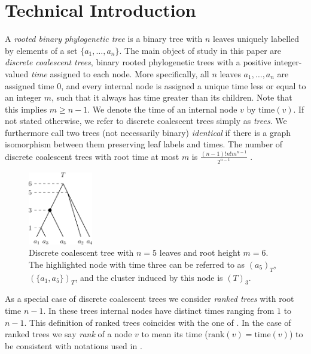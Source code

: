 \documentclass[11pt]{amsart}
\newcommand{\rank}{\mathrm{rank}}
\newcommand{\ntime}{\mathrm{time}}
\newcommand{\summary}[1]{} %
\begin{document}
\section{Technical Introduction}
\label{section:technical_introduction}

\summary{Introducing discrete coalescent trees and ranked trees}
A \emph{rooted binary phylogenetic tree} is a binary tree with $n$ leaves uniquely labelled by elements of a set $\{a_1, \ldots, a_n\}$.
The main object of study in this paper are \emph{discrete coalescent trees}, binary rooted phylogenetic trees with a positive integer-valued \emph{time} assigned to each node.
More specifically, all $n$ leaves $a_1, \ldots, a_n$ are assigned time $0$, and every internal node is assigned a unique time less or equal to an integer $m$, such that it always has time greater than its children.
Note that this implies $m \geq n-1$.
We denote the time of an internal node $v$ by $\ntime(v)$.
If not stated otherwise, we refer to discrete coalescent trees simply as \emph{trees}.
We furthermore call two trees (not necessarily binary) \emph{identical} if there is a graph isomorphism between them preserving leaf labels and times.
The number of discrete coalescent trees with root time at most $m$ is $\frac{(n-1)!n!m^{n-1}}{2^{n-1}}$ \autocite{Gavryushkin2018-ol}.

\begin{figure}[ht]
	\includegraphics[width=0.25\textwidth]{dtt_tree.eps}
	\caption{Discrete coalescent tree with $n = 5$ leaves and root height $m = 6$.
	The highlighted node with time three can be referred to as $(a_5)_T$, $(\{a_1,a_5\})_T$, and the cluster induced by this node is $(T)_3$.}
	\label{fig:dtt_tree}
\end{figure}

As a special case of discrete coalescent trees we consider \emph{ranked trees} with root time $n-1$.
In these trees internal nodes have distinct times ranging from $1$ to $n-1$.
This definition of ranked trees coincides with the one of \textcite{Collienne2020-iu}.
In the case of ranked trees we say \emph{rank} of a node $v$ to mean its time ($\rank(v) = \ntime(v)$) to be consistent with notations used in \autocite{Collienne2020-iu}.
\end{document}
